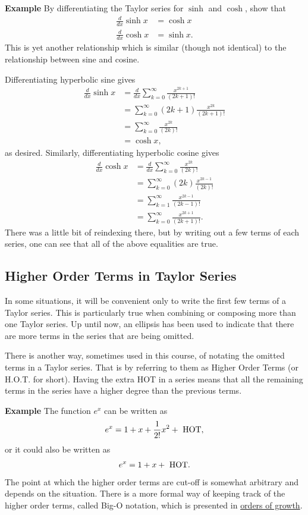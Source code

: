 \documentclass[twoside,openright,titlepage,a4paper]{book}
\begin{document}
\begin{sloppypar}
\textbf{Example} By differentiating the Taylor series for $\sinh$ and $\cosh$, show that
\begin{align*}
\frac{d}{dx} \sinh x &= \cosh x \\
\frac{d}{dx} \cosh x &= \sinh x.
\end{align*}
This is yet another relationship which is similar (though not identical) to the relationship between sine and cosine.
\begin{examplebox}
Differentiating hyperbolic sine gives
\begin{align*}
\frac{d}{dx}\sinh x &= \frac{d}{dx}\sum_{k=0}^\infty\frac{x^{2k+1}}{(2k+1)!} \\
&= \sum_{k=0}^\infty (2k+1) \frac{x^{2k}}{(2k+1)!} \\
&= \sum_{k=0}^\infty \frac{x^{2k}}{(2k)!} \\
&= \cosh x,
\end{align*}
as desired. Similarly, differentiating hyperbolic cosine gives
\begin{align*}
\frac{d}{dx}\cosh x &= \frac{d}{dx} \sum_{k=0}^\infty \frac{x^{2k}}{(2k)!} \\
&= \sum_{k=0}^\infty (2k) \frac{x^{2k-1}}{(2k)!} \\
&= \sum_{k=1}^\infty \frac{x^{2k-1}}{(2k-1)!} \\
&= \sum_{k=0}^\infty \frac{x^{2k+1}}{(2k+1)!}.
\end{align*}
There was a little bit of reindexing there, but by writing out a few terms of each series, one can see that all of the above equalities are true.
\end{examplebox}

\subsection{Higher Order Terms in Taylor Series}
In some situations, it will be convenient only to write the first few terms of a Taylor series. This is particularly true when combining or composing more than one Taylor series. Up until now, an ellipsis has been used to indicate that there are more terms in the series that are being omitted.

There is another way, sometimes used in this course, of notating the omitted terms in a Taylor series. That is by referring to them as Higher Order Terms (or H.O.T. for short). Having the extra HOT in a series means that all the remaining terms in the series have a higher degree than the previous terms.

\textbf{Example} The function $e^x$ can be written as \[e^x=1+x+\frac{1}{2!}x^2+\hbox{ HOT},\] or it could also be written as \[e^x=1+x+\hbox{ HOT}.\]
The point at which the higher order terms are cut-off is somewhat arbitrary and depends on the situation. There is a more formal way of keeping track of the higher order terms, called Big-O notation, which is presented in \hyperref[ChFunctionsSecOrdersOfGrowth]{orders of growth}.


\end{sloppypar}
\end{document}
